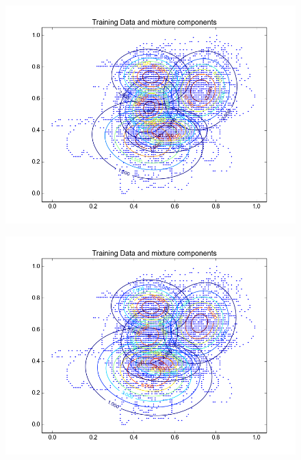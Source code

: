 \documentclass[11pt,a4paper]{article}
\begin{document}
\begin{minipage}[b]{0.25\textwidth}
\begin{figure}[H]
  \centering
  \includegraphics[width=.8\linewidth]{Figures/contours_dA.test10.png}

  \label{fig:sfig1}
\end{figure}%
\end{minipage}
\begin{minipage}[b]{0.25\textwidth}
\begin{figure}[H]
  \centering
  \includegraphics[width=.8\linewidth]{Figures/contours_dA.test15.png}

  \label{fig:sfig1}
\end{figure}%
\end{minipage}
\end{document}
